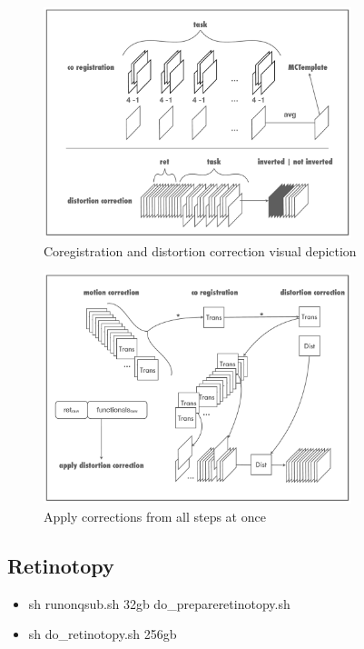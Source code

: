 \documentclass[12pt,a4paper]{scrartcl}
\begin{document}
\begin{figure}[h]
\begin{center}
\includegraphics[width=0.8\textwidth]{coregdist}
\caption[Coregistration and distortion correction visual depiction]{Coregistration and distortion correction visual depiction}
\end{center}
\end{figure}
\begin{figure}[h]
\begin{center}
\includegraphics[width=0.8\textwidth]{applycorr}
\caption[Apply corrections from all steps at once]{Apply corrections from all steps at once}
\end{center}
\end{figure}

\FloatBarrier

\subsection{Retinotopy}
\begin{itemize}
\item sh runonqsub.sh 32gb do\_prepareretinotopy.sh 
\item sh do\_retinotopy.sh 256gb
\end{itemize}
\end{document}
